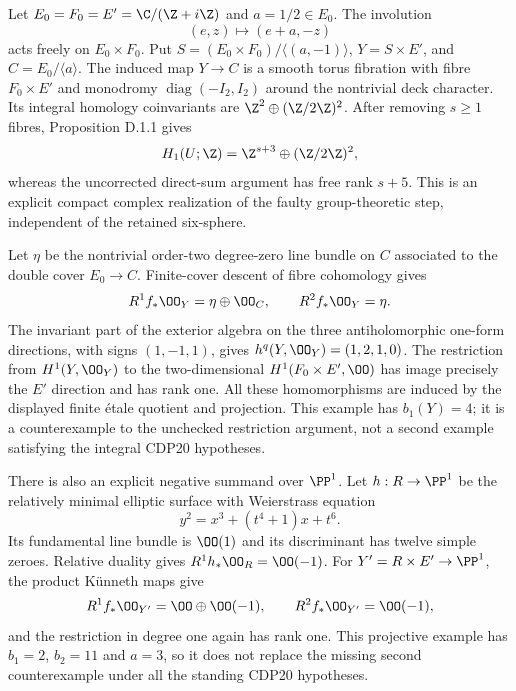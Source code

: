 \begin{example}
\label{st:D.1.5}
Let $E_0=F_0=E'=\C/(\Z+i\Z)$ and $a=1/2\in E_0$.
The involution
\[
(e,z)\longmapsto(e+a,-z)
\]
acts freely on $E_0\times F_0$. Put
$S=(E_0\times F_0)/\langle(a,-1)\rangle$,
$Y=S\times E'$, and $C=E_0/\langle a\rangle$.
The induced map $Y\to C$ is a smooth torus fibration with fibre
$F_0\times E'$ and monodromy
$\operatorname{diag}(-I_2,I_2)$ around the nontrivial deck character.
Its integral homology coinvariants are
$\Z^2\oplus(\Z/2\Z)^2$. After removing $s\geq1$ fibres,
Proposition D.1.1 gives
\[
H_1(U;\Z)=\Z^{s+3}\oplus(\Z/2\Z)^2,
\]
whereas the uncorrected direct-sum argument has free rank $s+5$.
This is an explicit compact complex realization of the faulty
group-theoretic step, independent of the retained six-sphere.

Let $\eta$ be the nontrivial order-two degree-zero line bundle on
$C$ associated to the double cover $E_0\to C$. Finite-cover descent
of fibre cohomology gives
\[
R^1f_*\OO_Y=\eta\oplus\OO_C,\qquad R^2f_*\OO_Y=\eta.
\]
The invariant part of the exterior algebra on the three
antiholomorphic one-form directions, with signs $(1,-1,1)$,
gives $h^q(Y,\OO_Y)=(1,2,1,0)$. The restriction from
$H^1(Y,\OO_Y)$ to the two-dimensional $H^1(F_0\times E',\OO)$
has image precisely the $E'$ direction and has rank one.
All these homomorphisms are induced by the displayed finite
\'etale quotient and projection. This example has $b_1(Y)=4$;
it is a counterexample to the unchecked restriction argument, not
a second example satisfying the integral CDP20 hypotheses.

There is also an explicit negative summand over $\PP^1$. Let
$h:R\to\PP^1$ be the relatively minimal elliptic surface with
Weierstrass equation
\[
y^2=x^3+(t^4+1)x+t^6.
\]
Its fundamental line bundle is $\OO(1)$ and its discriminant has
twelve simple zeroes. Relative duality gives
$R^1h_*\OO_R=\OO(-1)$. For $Y'=R\times E'\to\PP^1$,
the product K\"unneth maps give
\[
R^1f_*\OO_{Y'}=\OO\oplus\OO(-1),\qquad
R^2f_*\OO_{Y'}=\OO(-1),
\]
and the restriction in degree one again has rank one. This
projective example has $b_1=2$, $b_2=11$ and $a=3$, so it does not
replace the missing second counterexample under all the standing
CDP20 hypotheses.
\end{example}

